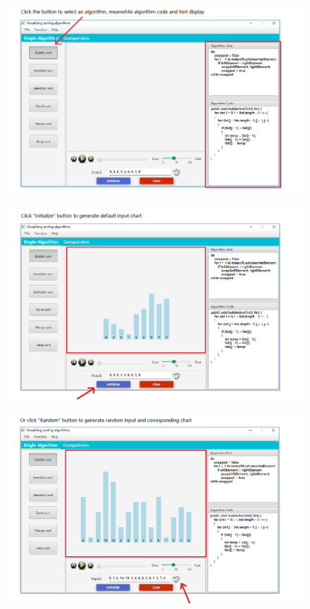 \documentclass[paper=a4, fontsize=11pt,twoside]{scrartcl}		%
\begin{document}
\begin{figure}[htbp]
\centering
\includegraphics[width=1\textwidth]{user_menu/2.png}
\label{user_menu2}
\end{figure}

\begin{figure}[htbp]
\centering
\includegraphics[width=1\textwidth]{user_menu/3.png}
\label{user_menu3}
\end{figure}

\begin{figure}[htbp]
\centering
\includegraphics[width=1\textwidth]{user_menu/4.png}
\label{user_menu4}
\end{figure}
\end{document}
